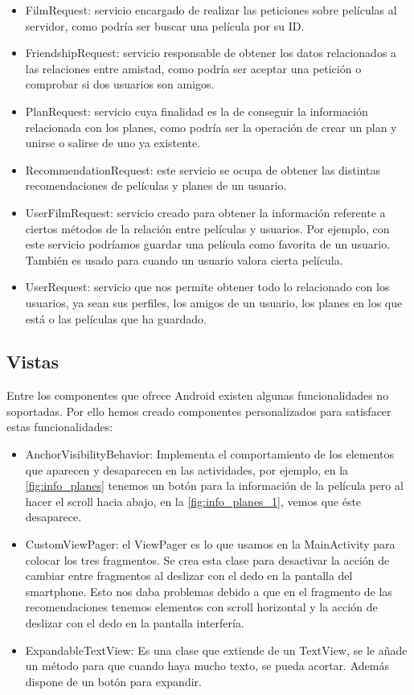 \begin{itemize}
    \item FilmRequest: servicio encargado de realizar las peticiones sobre películas al servidor, como podría ser buscar una película por su ID.
    \item FriendshipRequest: servicio responsable de obtener los datos relacionados a las relaciones entre amistad, como podría ser aceptar una petición o comprobar si dos usuarios son amigos.
    \item PlanRequest: servicio cuya finalidad es la de conseguir la información relacionada con los planes, como podría ser la operación de crear un plan y unirse o salirse de uno ya existente.
    \item RecommendationRequest: este servicio se ocupa de obtener las distintas recomendaciones de películas y planes de un usuario.
    \item UserFilmRequest: servicio creado para obtener la información referente a ciertos métodos de la relación entre películas y usuarios. Por ejemplo, con este servicio podríamos guardar una película como favorita de un usuario. También es usado para cuando un usuario valora cierta película.
    \item UserRequest: servicio que nos permite obtener todo lo relacionado con los usuarios, ya sean sus perfiles, los amigos de un usuario, los planes en los que está o las películas que ha guardado.
\end{itemize}

\subsection{Vistas}
\label{makereference4.4.7}
Entre los componentes que ofrece Android existen algunas funcionalidades no soportadas. Por ello hemos creado componentes personalizados para satisfacer estas funcionalidades:
\begin{itemize}
    \item AnchorVisibilityBehavior: Implementa el comportamiento de los elementos que aparecen y desaparecen en las actividades, por ejemplo, en la \autoref{fig:info_planes} tenemos un botón para la información de la película pero al hacer el scroll hacia abajo, en la \autoref{fig:info_planes_1}, vemos que éste desaparece.
    \item CustomViewPager: el ViewPager es lo que usamos en la MainActivity para colocar los tres fragmentos. Se crea esta clase para desactivar la acción de cambiar entre fragmentos al deslizar con el dedo en la pantalla del smartphone. Esto nos daba problemas debido a que en el fragmento de las recomendaciones tenemos elementos con scroll horizontal y la acción de deslizar con el dedo en la pantalla interfería.
    \item ExpandableTextView: Es una clase que extiende de un TextView, se le añade un método para que cuando haya mucho texto, se pueda acortar. Además dispone de un botón para expandir.
\end{itemize} 

